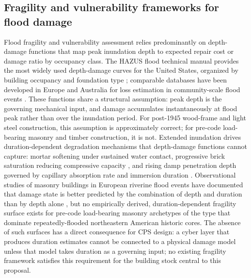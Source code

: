 \documentclass[11pt]{article}
\begin{document}
\subsection{Fragility and vulnerability frameworks for flood damage}
Flood fragility and vulnerability assessment relies predominantly on depth-damage
functions that map peak inundation depth to expected repair cost or damage ratio
by occupancy class.
The HAZUS flood technical manual provides the most widely used depth-damage curves
for the United States, organized by building occupancy and foundation type
\cite{fema2025hazus};
comparable databases have been developed in Europe and Australia for loss estimation
in community-scale flood events \cite{huizinga2017jrc,gerl2016review}.
These functions share a structural assumption: peak depth is the governing mechanical
input, and damage accumulates instantaneously at flood peak rather than over the
inundation period.
For post-1945 wood-frame and light steel construction, this assumption is
approximately correct; for pre-code load-bearing masonry and timber construction,
it is not.
Extended inundation drives duration-dependent degradation mechanisms that
depth-damage functions cannot capture: mortar softening under sustained water
contact, progressive brick saturation reducing compressive capacity
\cite{franzoni2015compressive,sathiparan2018effect}, and rising
damp penetration depth governed by capillary absorption rate and immersion duration
\cite{hall2009water}.
Observational studies of masonry buildings in European riverine flood events have
documented that damage state is better predicted by the combination of depth and
duration than by depth alone
\cite{kelman2004overview,schwarz2008damage,milanesi2018vulnerability}, but no empirically derived, duration-dependent
fragility surface exists for pre-code load-bearing masonry archetypes of the type
that dominate repeatedly-flooded northeastern American historic cores.
The absence of such surfaces has a direct consequence for CPS design: a cyber layer
that produces duration estimates cannot be connected to a physical damage model
unless that model takes duration as a governing input; no existing fragility
framework satisfies this requirement for the building stock central to this
proposal.
\end{document}
